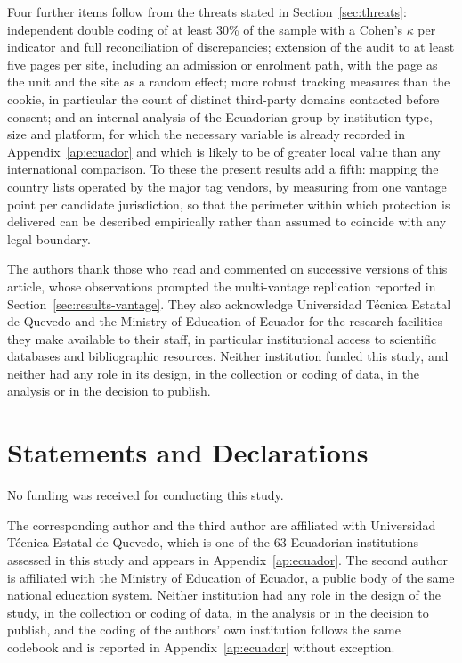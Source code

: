 \documentclass[pdflatex,sn-basic,Numbered,iicol]{sn-jnl}
\theoremstyle{thmstyleone}
\theoremstyle{thmstyletwo}
\theoremstyle{thmstylethree}
\begin{document}
	Four further items follow from the threats stated in Section~\ref{sec:threats}: independent double coding of at least 30\% of the sample with a Cohen's $\kappa$ per indicator and full reconciliation of discrepancies; extension of the audit to at least five pages per site, including an admission or enrolment path, with the page as the unit and the site as a random effect; more robust tracking measures than the cookie, in particular the count of distinct third-party domains contacted before consent; and an internal analysis of the Ecuadorian group by institution type, size and platform, for which the necessary variable is already recorded in Appendix~\ref{ap:ecuador} and which is likely to be of greater local value than any international comparison. To these the present results add a fifth: mapping the country lists operated by the major tag vendors, by measuring from one vantage point per candidate jurisdiction, so that the perimeter within which protection is delivered can be described empirically rather than assumed to coincide with any legal boundary.
	
	\backmatter
	
	The authors thank those who read and commented on successive versions of this article, whose observations prompted the multi-vantage replication reported in Section~\ref{sec:results-vantage}. They also acknowledge Universidad T\'ecnica Estatal de Quevedo and the Ministry of Education of Ecuador for the research facilities they make available to their staff, in particular institutional access to scientific databases and bibliographic resources. Neither institution funded this study, and neither had any role in its design, in the collection or coding of data, in the analysis or in the decision to publish.
	
	\section*{Statements and Declarations}
	
	No funding was received for conducting this study.
	
	The corresponding author and the third author are affiliated with Universidad T\'ecnica Estatal de Quevedo, which is one of the 63 Ecuadorian institutions assessed in this study and appears in Appendix~\ref{ap:ecuador}. The second author is affiliated with the Ministry of Education of Ecuador, a public body of the same national education system. Neither institution had any role in the design of the study, in the collection or coding of data, in the analysis or in the decision to publish, and the coding of the authors' own institution follows the same codebook and is reported in Appendix~\ref{ap:ecuador} without exception.
	
\end{document}
